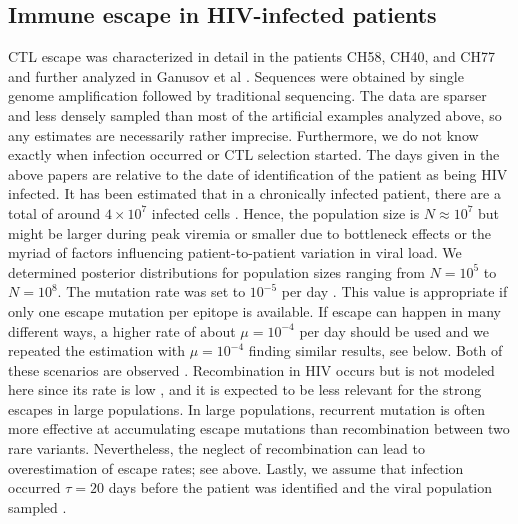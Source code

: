 \documentclass{frontiers}
\begin{document}
\subsection{Immune escape in HIV-infected patients} 
CTL escape was characterized in detail in the
patients CH58, CH40, and CH77
\citep{Goonetilleke:2009p42296, SalazarGonzalez:2009p35091} and further analyzed
in Ganusov et al \cite{ganusov_fitness_2011}. Sequences were obtained by single
genome amplification followed by traditional sequencing.
The data are sparser and less densely sampled than most of the artificial
examples analyzed above, so any estimates are necessarily rather imprecise.
Furthermore, we do not know exactly when infection occurred or CTL selection
started. The days given in the above papers are relative to the date of
identification of the patient as being HIV infected. It has been estimated that
in a chronically infected patient, there are a total of
around $4 \times 10^7$ infected cells \citep{haase_quantitative_1996}. 
Hence, the population size is $N\approx 10^7$  
but might be larger during peak viremia or smaller
due to bottleneck effects or the myriad of factors influencing patient-to-patient
variation in viral load. We determined posterior distributions for
population sizes ranging from $N=10^5$ to $N=10^8$. The mutation rate was set to
$10^{-5}$ per day \citep{Mansky:1995p38971}. This value is appropriate
if only one escape mutation per epitope is available. If escape can
happen in many different ways, a higher rate of about $\mu=10^{-4}$ per
day should be used and we repeated the estimation with $\mu=10^{-4}$
finding similar results, see below. Both of these scenarios are observed \citep{henn_whole_2012}.
Recombination in HIV occurs but is not
modeled here since its rate is low \citep{Neher:2010p32691,Batorsky:2011p40107},
and it is expected to be less relevant for the strong escapes in large
populations. In large populations, recurrent mutation is often more effective
at accumulating escape mutations than recombination between two rare variants.
Nevertheless, the neglect of recombination can lead to overestimation of escape
rates; see above. Lastly, we assume that infection occurred $\tau=20$ days before
the patient was identified and the viral population sampled \cite{Goonetilleke:2009p42296}.
\end{document}

